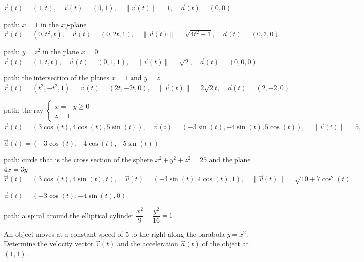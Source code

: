 \begin{Answer}
    
        \Question $\vec r(t) = \left(1, t \right), \quad \vec v(t) = \left(0, 1 \right), \quad \|\vec v(t) \| = 1,  \quad \vec a(t) = \left(0, 0\right)$
        
         path: $x=1$ in the $xy$-plane
        \Question $\vec r(t) = \left(0, t^2, t \right), \quad \vec v(t) = \left(0, 2t,1 \right), \quad \|\vec v(t) \| = \sqrt{4t^2 + 1},  \quad \vec a(t) = \left(0, 2, 0\right)$
        
         path: $y=z^2$ in the plane $x=0$
        \Question $\vec r(t) = \left(1, t, t \right), \quad \vec v(t) = \left(0, 1,1 \right), \quad \|\vec v(t) \| = \sqrt{2},  \quad \vec a(t) = \left(0, 0, 0\right)$
        
         path: the intersection of the planes $x=1$ and $y=z$
        \Question $\vec r(t) = \left(t^2, -t^2, 1 \right), \quad \vec v(t) = \left(2t, -2t, 0 \right), \quad \|\vec v(t) \| = 2\sqrt{2}t,  \quad \vec a(t) = \left(2, -2, 0\right)$
        
         path: the ray $\left\{ \begin{array}{l} x=-y \geq 0 \\ z=1 \end{array} \right.$
        \Question $\vec r(t) = \left(3 \cos (t), 4 \cos (t), 5\sin (t)\right), \quad \vec v(t) = \left(-3 \sin (t), -4 \sin (t), 5\cos (t) \right), \quad \|\vec v(t) \| = 5, $ 
       
        $\vec a(t) = \left(-3 \cos (t), -4 \cos (t), -5\sin (t)\right)$
        
         path: circle that is the cross section of the sphere $x^2+y^2+z^2=25$ and the plane $4x=3y$
        \Question $\vec r(t) = \left(3 \cos (t), 4 \sin (t), t\right), \quad \vec v(t) = \left(-3 \sin (t), 4 \cos (t), 1 \right), \quad \|\vec v(t) \| = \sqrt{10 + 7 \cos^2 (t)},$
        
         $\vec a(t) = \left(-3 \cos (t), -4 \sin (t), 0 \right)$
         
         path: a spiral around the elliptical cylinder $\dfrac{x^2}{9} + \dfrac{y^2}{16} = 1$

\end{Answer}

\begin{Exercise}[difficulty = 3] An object moves at a constant speed of 5 to the right along the parabola $y=x^2$. Determine the velocity vector $\vec v(t)$ and the acceleration $\vec a(t)$ of the object at $(1,1)$. 

\end{Exercise}

